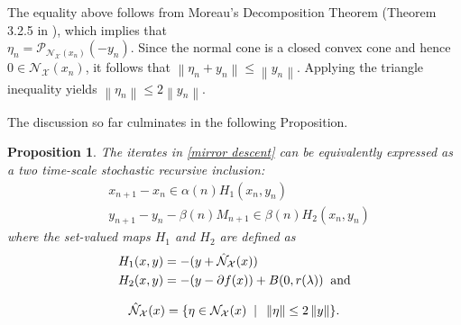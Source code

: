 \documentclass[9pt,journal,twoside,web]{ieeecolor}
\newtheorem{proposition}{Proposition}
\newcommand{\norm}[1]{\left\lVert #1 \right\rVert}
\begin{document}
The equality above follows from Moreau’s Decomposition Theorem (Theorem 3.2.5 in \cite{hiriart2013convex}), which implies that 
\\ $ \eta_n = \mathcal{P}_{\mathcal{N}_\mathcal{X}(x_n)} (-y_n)$.
Since the normal cone is a closed convex cone and hence $0 \in \mathcal{N}_\mathcal{X}(x_n)$, it follows that  $ \norm{\eta_n + y_n} \leq \norm{y_n}$.
Applying the triangle inequality yields $ \norm{\eta_n} \leq 2 \norm{y_n}.$

The discussion so far culminates in the following Proposition. 

\begin{proposition}
   The  iterates in \eqref{mirror descent} can be equivalently expressed as a two time-scale stochastic recursive inclusion:
\begin{equation*}
        \begin{split}
           & x_{n+1} -x_n   \in  \alpha(n) H_1(x_n,y_n)
            \\ & y_{n+1} - y_n - \beta(n) M_{n+1}  \in \beta(n) H_2 (x_n,y_n)
        \end{split}
    \end{equation*}
    where the set-valued maps $H_1$ and $H_2$ are defined as
    \begin{equation*}
        \begin{split}
            H_1(x,y)  & = -(y+ \Hat{\mathcal{N}}_\mathcal{X} (x)) 
            \\ H_2(x,y) & = -( y- \partial  f(x) ) + B(0,r(\lambda)) \; \; \text{and}
        \end{split}
    \end{equation*}
    
    \begin{equation*}
        \Hat{\mathcal{N}}_\mathcal{X} (x)  = \{ \eta \in \mathcal{N}_\mathcal{X}(x) \; \; | \; \; \norm{\eta} \leq 2 \norm{y} \} .
    \end{equation*}
    \label{Proposition 2}
\end{proposition}
\end{document}
